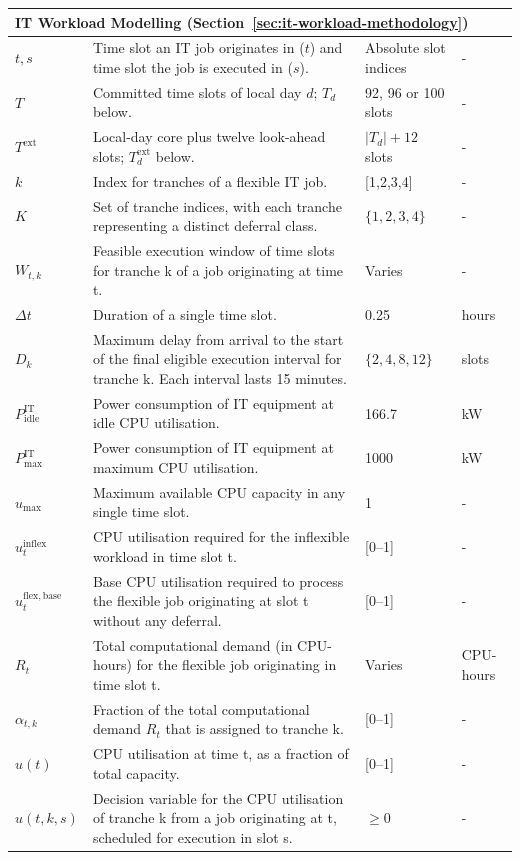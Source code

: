 \documentclass[lettersize,journal]{IEEEtran}
\begin{document}
{{\begin{longtable}{p{} p{} p{} p{}}
\midrule
\multicolumn{4}{l}{\textbf{IT Workload Modelling (Section~\ref{sec:it-workload-methodology})}} \\
\midrule
$t, s$ & Time slot an IT job originates in ($t$) and time slot the job is executed in ($s$). & Absolute slot indices & - \\
$T$ & Committed time slots of local day $d$; $T_d$ below. & 92, 96 or 100 slots & - \\
$T^{\mathrm{ext}}$ & Local-day core plus twelve look-ahead slots; $T_d^{\mathrm{ext}}$ below. & $|T_d|+12$ slots & - \\
$k$ & Index for tranches of a flexible IT job. & [1,2,3,4] & - \\
$K$ & Set of tranche indices, with each tranche representing a distinct deferral class. & $\{1, 2, 3, 4\}$ & - \\
$W_{t,k}$ & Feasible execution window of time slots for tranche k of a job originating at time t. & Varies & - \\
$\Delta t$ & Duration of a single time slot. & 0.25 & hours \\
$D_k$ & Maximum delay from arrival to the start of the final eligible execution interval for tranche k. Each interval lasts 15 minutes. & $\{2, 4, 8, 12\}$ & slots \\
$P^{\mathrm{IT}}_{\mathrm{idle}}$ & Power consumption of IT equipment at idle CPU utilisation. & 166.7 &kW \\
$P^{\mathrm{IT}}_{\mathrm{max}}$ & Power consumption of IT equipment at maximum CPU utilisation. & 1000 &kW \\
$u_{\max}$ & Maximum available CPU capacity in any single time slot. & 1 & - \\
$u_t^{\mathrm{inflex}}$ & CPU utilisation required for the inflexible workload in time slot t. & [0–1] & - \\
$u_t^{\mathrm{flex,base}}$ & Base CPU utilisation required to process the flexible job originating at slot t without any deferral. & [0–1] & - \\
$R_t$ & Total computational demand (in CPU-hours) for the flexible job originating in time slot t. & Varies & CPU-hours \\
$\alpha_{t,k}$ & Fraction of the total computational demand $R_t$ that is assigned to tranche k. & [0–1] & - \\
$u(t)$ & CPU utilisation at time t, as a fraction of total capacity. & [0–1] & - \\
$u(t,k,s)$ & Decision variable for the CPU utilisation of tranche k from a job originating at t, scheduled for execution in slot s. & $\geq 0$ & - \\

\end{longtable}}}
\end{document}
